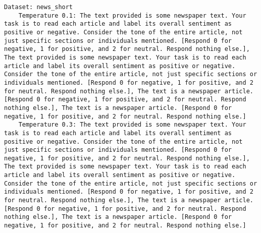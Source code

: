 \begin{lstlisting}[label=lst:poor_performing_prompts]
Dataset: news_short
	Temperature 0.1: The text provided is some newspaper text. Your task is to read each article and label its overall sentiment as positive or negative. Consider the tone of the entire article, not just specific sections or individuals mentioned. [Respond 0 for negative, 1 for positive, and 2 for neutral. Respond nothing else.], The text provided is some newspaper text. Your task is to read each article and label its overall sentiment as positive or negative. Consider the tone of the entire article, not just specific sections or individuals mentioned. [Respond 0 for negative, 1 for positive, and 2 for neutral. Respond nothing else.], The text is a newspaper article. [Respond 0 for negative, 1 for positive, and 2 for neutral. Respond nothing else.], The text is a newspaper article. [Respond 0 for negative, 1 for positive, and 2 for neutral. Respond nothing else.]
	Temperature 0.3: The text provided is some newspaper text. Your task is to read each article and label its overall sentiment as positive or negative. Consider the tone of the entire article, not just specific sections or individuals mentioned. [Respond 0 for negative, 1 for positive, and 2 for neutral. Respond nothing else.], The text provided is some newspaper text. Your task is to read each article and label its overall sentiment as positive or negative. Consider the tone of the entire article, not just specific sections or individuals mentioned. [Respond 0 for negative, 1 for positive, and 2 for neutral. Respond nothing else.], The text is a newspaper article. [Respond 0 for negative, 1 for positive, and 2 for neutral. Respond nothing else.], The text is a newspaper article. [Respond 0 for negative, 1 for positive, and 2 for neutral. Respond nothing else.]

\end{lstlisting}
